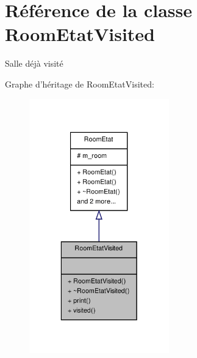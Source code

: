 \hypertarget{class_room_etat_visited}{\section{Référence de la classe Room\-Etat\-Visited}
\label{class_room_etat_visited}
}


Salle déjà visité  




Graphe d'héritage de Room\-Etat\-Visited\-:
\nopagebreak
\begin{figure}[H]
\begin{center}
\leavevmode
\includegraphics[width=172pt]{class_room_etat_visited__inherit__graph}
\end{center}
\end{figure}



